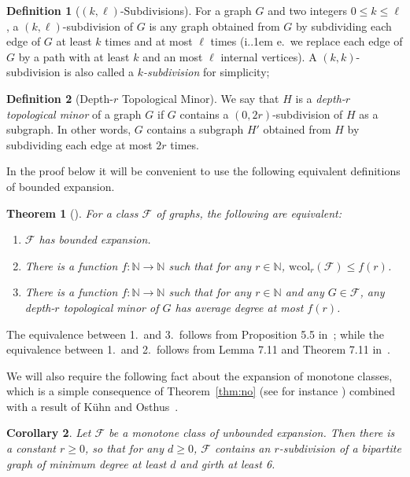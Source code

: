 \documentclass[11pt]{article}
\newcommand*\ie{i.\kern.1em e.\ }
\newtheorem{thm}{Theorem}[section]
\newtheorem{corollary}[thm]{Corollary}
\theoremstyle{definition}
\newtheorem{definition}{Definition}
\newcommand{\wcol}{\mathrm{wcol}}
\renewcommand{\le}{\leqslant}
\renewcommand{\leq}{\leqslant}
\renewcommand{\ge}{\geqslant}
\begin{document}
\begin{definition}[$(k,\ell)$-Subdivisions]
For a graph $G$ and two integers $0\le k\le \ell$, a $(k,
\ell)$-subdivision of $G$ is any graph obtained from $G$ by
subdividing each edge of $G$ at least $k$ times and at most $\ell$
times (\ie we replace each edge of $G$ by a path with at least $k$
and an most $\ell$ internal vertices). A $(k,k)$-subdivision is also
called a \emph{$k$-subdivision} for simplicity;
\end{definition}

\begin{definition}[Depth-$r$ Topological Minor]
We say that $H$ is a \emph{depth-$r$ topological minor} of a graph $G$
if $G$ contains a $(0, 2r)$-subdivision of $H$ as a subgraph. In other
words, $G$ contains a subgraph $H'$ obtained from $H$ by subdividing
each edge at most $2r$ times.
\end{definition}
In the proof below it will be convenient to use the following equivalent definitions of bounded
expansion. 

\begin{thm}[\cite{NO12}]\label{thm:expansion equivalents}\label{thm:no}\label{thm:be}
For a class $\mathcal{F}$ of graphs, the following are equivalent:
\begin{enumerate}
\item $\mathcal F$ has bounded expansion.
\item \label{thm:ee wcol}
There is a function $f : \mathbb N \to \mathbb N$ such that for any $r \in \mathbb N$,
$\wcol_r(\mathcal F) \leq f(r)$.
\item \label{thm:ee top}  There is a function $f : \mathbb N \to \mathbb N$ such that for any $r \in
\mathbb N$ and any $G \in \mathcal F$, any depth-$r$ topological minor of $G$ has average degree at
most $f(r)$.
\end{enumerate}
\end{thm}
\noindent
The equivalence between 1.\ and 3.\ follows from Proposition
5.5 in~\cite{NO12}; while the equivalence between 1.\ and 2.\ follows
from Lemma 7.11 and Theorem 7.11 in~\cite{NO12}.

\noindent
We will also require the following fact about the expansion of monotone classes, which is a simple
consequence of Theorem~\ref{thm:no} (see for instance \cite{NO15}) combined with a result of K\"uhn
and Osthus~\cite{KO04}.

\begin{corollary}\label{cor:no}
Let $\mathcal{F}$ be a monotone class of unbounded expansion. Then
there is a constant $r\ge 0$, so that for any $d\ge 0$, $\mathcal{F}$
contains an $r$-subdivision of a bipartite graph of minimum degree at
least $d$ and girth at least 6.
\end{corollary}
\end{document}
